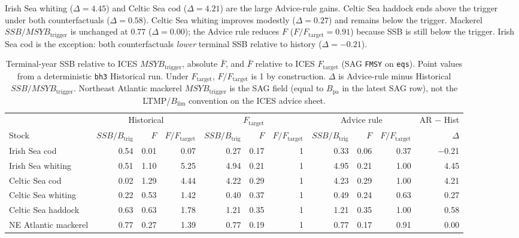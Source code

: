 \documentclass[11pt,a4paper]{article}
\newcommand{\Blim}{B_{\lim}}
\newcommand{\Btrig}{MSYB_{\mathrm{trigger}}}
\newcommand{\Ftar}{F_{\mathrm{target}}}
\begin{document}
Irish Sea whiting ($\Delta = 4.45$) and Celtic Sea cod ($\Delta = 4.21$)
are the large Advice-rule gains. Celtic Sea haddock ends above the
trigger under both counterfactuals ($\Delta = 0.58$). Celtic Sea whiting
improves modestly ($\Delta = 0.27$) and remains below the trigger.
Mackerel $SSB/\Btrig$ is unchanged at $0.77$ ($\Delta = 0.00$); the
Advice rule reduces $F$ ($F/\Ftar = 0.91$) because SSB is still below
the trigger. Irish Sea cod is the exception: both counterfactuals
\emph{lower} terminal SSB relative to history ($\Delta = -0.21$).

\begin{table}[htbp]
\centering
\caption{Terminal-year SSB relative to ICES $\Btrig$, absolute
$\bar F$, and $\bar F$ relative to ICES $\Ftar$ (SAG \texttt{FMSY} on
\texttt{eqs}). Point values from a deterministic \texttt{bh3} Historical run.
Under $F_{\mathrm{target}}$, $F/\Ftar$ is 1 by construction. $\Delta$ is Advice-rule minus
Historical $SSB/\Btrig$. Northeast Atlantic mackerel $\Btrig$ is the SAG
field (equal to $B_{\mathrm{pa}}$ in the latest SAG row), not the
LTMP/$\Blim$ convention on the ICES advice sheet.}
\label{tab:position}
\footnotesize
\begin{tabular}{@{}l rrr rrr rrr r@{}}
\toprule
 & \multicolumn{3}{c}{Historical} & \multicolumn{3}{c}{$F_{\mathrm{target}}$} & \multicolumn{3}{c}{Advice rule} & AR $-$ Hist \\
\cmidrule(lr){2-4}\cmidrule(lr){5-7}\cmidrule(lr){8-10}\cmidrule(lr){11-11}
Stock & $SSB/B_{\mathrm{trig}}$ & $F$ & $F/\Ftar$
      & $SSB/B_{\mathrm{trig}}$ & $F$ & $F/\Ftar$
      & $SSB/B_{\mathrm{trig}}$ & $F$ & $F/\Ftar$
      & $\Delta$ \\
\midrule
Irish Sea cod        & 0.54 & 0.01 & 0.07 & 0.27 & 0.17 & 1 & 0.33 & 0.06 & 0.37 & $-$0.21 \\
Irish Sea whiting    & 0.51 & 1.10 & 5.25 & 4.94 & 0.21 & 1 & 4.95 & 0.21 & 1.00 & 4.45 \\
Celtic Sea cod       & 0.02 & 1.29 & 4.44 & 4.22 & 0.29 & 1 & 4.23 & 0.29 & 1.00 & 4.21 \\
Celtic Sea whiting   & 0.22 & 0.53 & 1.42 & 0.40 & 0.37 & 1 & 0.49 & 0.24 & 0.63 & 0.27 \\
Celtic Sea haddock   & 0.63 & 0.63 & 1.78 & 1.21 & 0.35 & 1 & 1.21 & 0.35 & 1.00 & 0.58 \\
NE Atlantic mackerel & 0.77 & 0.27 & 1.39 & 0.77 & 0.19 & 1 & 0.77 & 0.17 & 0.91 & 0.00 \\
\bottomrule
\end{tabular}
\end{table}
\end{document}
